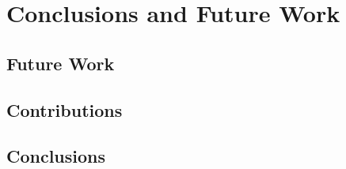 \chapter{Conclusions and Future Work} \label{chap:concl}

\section*{}

\section{Future Work}

\section{Contributions}

\section{Conclusions}